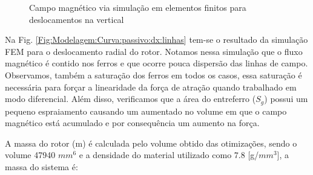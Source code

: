 \begin{figure}[!ht]
	\centering
		\label{Fig:Modelagem:Curva:passivo:dy:linhas:0}
		\label{Fig:Modelagem:Curva:passivo:dy:linhas:1,2}
	\caption{Campo magnético via simulação em elementos finitos para deslocamentos na vertical}
	\label{Fig:Modelagem:Curva:passivo:dy:linhas}
\end{figure}

Na Fig. \ref{Fig:Modelagem:Curva:passivo:dx:linhas} tem-se o resultado da simulação FEM para o deslocamento radial do rotor. Notamos nessa simulação que o fluxo magnético é contido nos ferros e que ocorre pouca dispersão das linhas de campo. Observamos, também a saturação dos ferros em todos os casos, essa saturação é necessária para forçar a linearidade da força de atração quando trabalhado em modo diferencial. Além disso,  verificamos que a área do entreferro ($S_g$) possui um pequeno espraiamento causando um aumentado no volume em que o campo magnético está acumulado e por consequência um aumento na força. 


A massa do rotor (m) é calculada pelo volume obtido das otimizações, sendo o volume 47940 $mm^6$ e a densidade do material utilizado como $7.8$ [g/$mm^3$], a massa do sistema é:

